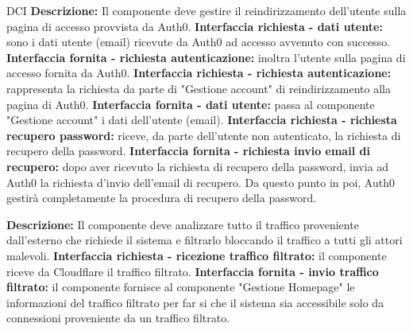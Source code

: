 \begin{listaPersonale}{DCI}
    \textbf{Descrizione:} Il componente deve gestire il reindirizzamento dell'utente sulla pagina di accesso provvista da Auth0.
    \textbf{Interfaccia richiesta - dati utente:} sono i dati utente (email) ricevute da Auth0 ad accesso avvenuto con successo.
    \textbf{Interfaccia fornita - richiesta autenticazione:} inoltra l'utente sulla pagina di accesso fornita da Auth0.
    \textbf{Interfaccia richiesta - richiesta autenticazione:} rappresenta la richiesta da parte di "Gestione account" di reindirizzamento alla pagina di Auth0.
    \textbf{Interfaccia fornita - dati utente:} passa al componente "Gestione account" i dati dell'utente (email).
    \textbf{Interfaccia richiesta - richiesta recupero password:} riceve, da parte dell'utente non autenticato, la richiesta di recupero della password.
    \textbf{Interfaccia fornita - richiesta invio email di recupero:} dopo aver ricevuto la richiesta di recupero della password, invia ad Auth0 la richiesta d'invio dell'email di recupero. Da questo punto in poi, Auth0 gestirà completamente la procedura di recupero della password.


    \textbf{Descrizione:} Il componente deve analizzare tutto il traffico proveniente dall'esterno che richiede il sistema e filtrarlo bloccando il traffico a tutti gli attori malevoli.
    \textbf{Interfaccia richiesta - ricezione traffico filtrato:} il componente riceve da Cloudflare il traffico filtrato.
    \textbf{Interfaccia fornita - invio traffico filtrato:} il componente fornisce al componente "Gestione Homepage" le informazioni del traffico filtrato per far si che il sistema sia accessibile solo da connessioni proveniente da un traffico filtrato.

\end{listaPersonale}